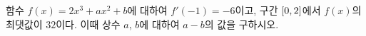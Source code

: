 함수 $f(x)=2x^3+ax^2+b$에 대하여 $f'(-1)=-6$이고, 구간 $[0{,}\mkern3mu\mathopen{}2]$에서 $f(x)$의 최댓값이 $32$이다. 이때 상수 $a$, $b$에 대하여 $a-b$의 값을 구하시오.
